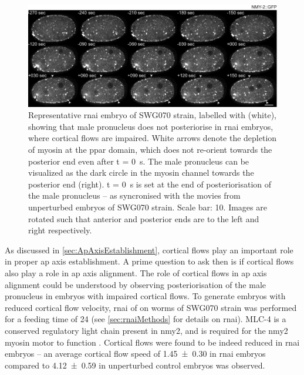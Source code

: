 \begin{figure}
\centering
\includegraphics[width=\textwidth]{Results/FigExpMlc4/mlc4Micrograph.pdf}
\caption[Representative micrograph:  \acs{rnai} embryos]{Representative  \ac{rnai} embryo of SWG070 strain, labelled with  (white), showing that male pronucleus does not posteriorise in  \ac{rnai} embryos, where cortical flows are impaired. White arrows denote the depletion of myosin at the \ac{ppar} domain, which does not re-orient towards the posterior end even after t = \SI{0}{\second}. The male pronucleus can be visualized as the dark circle in the myosin channel towards the posterior end (right). t = \SI{0}{\second} is set at the end of posteriorisation of the male pronucleus -- as syncronised with the movies from unperturbed embryos of SWG070 strain. Scale bar: \SI{10}{\unitLength}. Images are rotated such that anterior and posterior ends are to the left and right respectively.}
\label{fig:swg070Mlc4Micrograph}
\end{figure}

As discussed in \autoref{sec:ApAxisEstablishment}, cortical flows play an important role in proper \ac{ap} axis establishment. A prime question to ask then is if cortical flows also play a role in \ac{ap} axis alignment. The role of cortical flows in \ac{ap} axis alignment could be understood by observing posteriorisation of the male pronucleus in embryos with impaired cortical flows. To generate embryos with reduced cortical flow velocity, \ac{rnai} of  on worms of SWG070 strain was performed for a feeding time of \SI{24}{\unitRNAiTime} (see \autoref{sec:rnaiMethods} for details on \ac{rnai}). MLC-4 is a conserved regulatory light chain present in \ac{nmy2}, and is required for the \ac{nmy2} myosin motor to function \citep{shelton1999nonmuscle}. Cortical flows were found to be indeed reduced in  \ac{rnai} embryos -- an average cortical flow speed of \SI{1.45 +- 0.30}{\unitCrtxVel} in  \ac{rnai} embryos compared to \SI{4.12 +- 0.59}{\unitCrtxVel} in unperturbed control embryos was observed.

